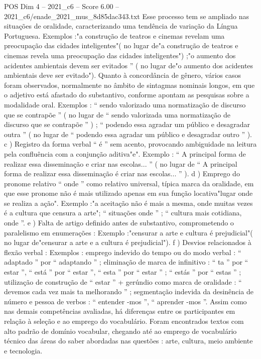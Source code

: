 \begin{textsample}{POS Dim 4 – 2021\_c6 – Score 6.00 – 2021\_c6/enade\_2021\_mus\_8d85dac343.txt}
Esse processo tem se ampliado nas situações de oralidade, caracterizando uma tendência de variação da Língua Portuguesa.
Exemplos :"a construção de teatros e cinemas revelam uma preocupação das cidades inteligentes"( no lugar de"a construção de teatros e cinemas revela uma preocupação das cidades inteligentes") ;"o aumento dos acidentes ambientais devem ser evitados ” ( no lugar de"o aumento dos acidentes ambientais deve ser evitado").
Quanto à concordância de gênero, vários casos foram observados, normalmente no âmbito de sintagmas nominais longos, em que o adjetivo está afastado do substantivo, conforme apontam as pesquisas sobre a modalidade oral.
Exemplos : “ sendo valorizado uma normatização de discurso que se contrapõe ” ( no lugar de “ sendo valorizada uma normatização de discurso que se contrapõe ” ) ; “ podendo essa agradar um público e desagradar outra ” ( no lugar de “ podendo essa agradar um público e desagradar outro ” ). c ) Registro da forma verbal “ é ” sem acento, provocando ambiguidade na leitura pela confluência com a conjunção aditiva"e".
Exemplo : “ A principal forma de realizar essa disseminação e criar nas escolas... ” ( no lugar de “ A principal forma de realizar essa disseminação é criar nas escolas... ” ). d ) Emprego do pronome relativo “ onde ” como relativo universal, típica marca da oralidade, em que esse pronome não é mais utilizado apenas em sua função locativa"lugar onde se realiza a ação".
Exemplo :"a aceitação não é mais a mesma, onde muitas vezes é a cultura que censura a arte"; “ situações onde ” ; “ cultura mais cotidiana, onde ”. e ) Falta de artigo definido antes de substantivo, comprometendo o paralelismo em enumerações : Exemplo :"censurar a arte e cultura é prejudicial"( no lugar de"censurar a arte e a cultura é prejudicial"). f ) Desvios relacionados à flexão verbal : Exemplos : emprego indevido do tempo ou do modo verbal : “ adaptado ” por “ adaptando ” ; eliminação de marca de infinitivo : “ ta ” por “ estar ”, “ está ” por “ estar ”, “ esta ” por “ estar ” ; “ estás ” por “ estas ” ; utilização de construção de “ estar ” + gerúndio como marca de oralidade : “ devemos cada vez mais ta melhorando ” ; segmentação indevida da desinência de número e pessoa de verbos : “ entender -mos ”, “ aprender -mos ”.
Assim como nas demais competências avaliadas, há diferenças entre os participantes em relação à seleção e ao emprego do vocabulário.
Foram encontrados textos com alto padrão de domínio vocabular, chegando até ao emprego de vocabulário técnico das áreas do saber abordadas nas questões : arte, cultura, meio ambiente e tecnologia.

\end{textsample}
